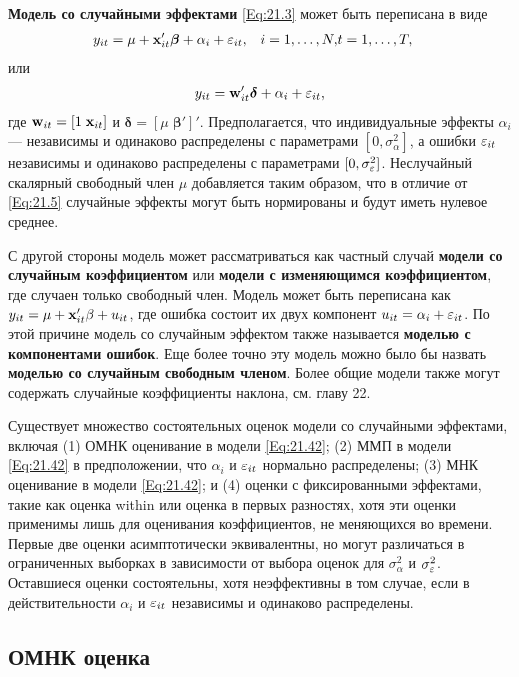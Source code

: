 \textbf{Модель со случайными эффектами} \ref{Eq:21.3} может быть переписана в виде
 \begin{align}
&y_{it}=\mu + \mathbf{x}'_{it} \bm\beta +\alpha_i + \varepsilon_{it},
&i=1, \dots, N,
& t=1, \dots, T,
\label{Eq:21.41}
\end{align}
или
 \begin{align}
y_{it}=\mathbf w'_{it} \bm\delta+\alpha_i + \varepsilon_{it},
\label{Eq:21.42}
\end{align}
где $\mathbf w_{it} = [1  \; \mathbf{x}_{it}]$ и $\bm\delta=[\mu \; \bm\beta']'$. Предполагается, что индивидуальные эффекты $\alpha_i$ --- независимы и одинаково распределены  с параметрами $[0, \sigma^2_{\alpha}]$, а ошибки $\varepsilon_{it}$ независимы и одинаково распределены с параметрами $[0, \sigma^2_\varepsilon]$. Неслучайный скалярный свободный член $\mu$ добавляется таким образом, что в отличие от \ref{Eq:21.5} случайные эффекты могут быть нормированы и будут иметь нулевое среднее.

С другой стороны модель может рассматриваться как частный случай \textbf{модели со случайным коэффициентом} или \textbf{модели с изменяющимся коэффициентом}, где случаен только свободный член. Модель может быть переписана как $y_{it}=\mu+\mathbf{x}'_{it}\beta+u_{it}$, где ошибка состоит их двух компонент $u_{it}=\alpha_i+\varepsilon_{it}$. По этой причине модель со случайным эффектом также называется \textbf{моделью с компонентами ошибок}. Еще более точно эту модель можно было бы назвать \textbf{моделью со случайным свободным членом}. Более общие модели также могут содержать случайные коэффициенты наклона, см. главу 22.

Существует множество состоятельных оценок модели со случайными эффектами, включая (1) ОМНК оценивание в модели \ref{Eq:21.42}; (2) ММП в модели \ref{Eq:21.42} в предположении, что $\alpha_i$ и $\varepsilon_{it}$ нормально распределены; (3) МНК оценивание в модели \ref{Eq:21.42}; и (4) оценки с фиксированными эффектами, такие как оценка within или оценка в первых разностях, хотя эти оценки применимы лишь для оценивания коэффициентов, не меняющихся во времени. Первые две оценки асимптотически эквивалентны, но могут различаться в ограниченных выборках в зависимости от выбора оценок для $\sigma^2_{\alpha}$ и $\sigma^2_\varepsilon$. Оставшиеся оценки состоятельны, хотя неэффективны в том случае, если в действительности $\alpha_i$ и $\varepsilon_{it}$ независимы и одинаково распределены.

\subsection{ОМНК оценка}

